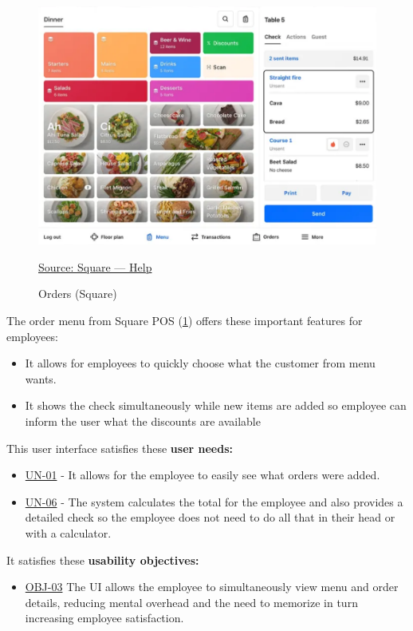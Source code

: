 \documentclass[]{VUMIFTemplateClass}
\begin{document}
\begin{figure}[H]
    \centering
    \includegraphics[width=\textwidth]{images/examples/square_orders.png}
    \caption{Orders (Square)}
    \href{https://squareup.com/help/us/en}{Source: Square — Help}
    \label{fig:square-orders}
\end{figure}

The order menu from Square POS (\ref{fig:square-orders}) offers these important features for employees:

\begin{itemize}
    \item It allows for employees to quickly choose what the customer from menu wants.
    \item It shows the check simultaneously while new items are added so employee can inform the user what the discounts are available
\end{itemize}

This user interface satisfies these \textbf{user needs:}

\begin{itemize}
    \item \hyperref[UN-01]{UN-01} - It allows for the employee to easily see what orders were added.
    \item \hyperref[UN-06]{UN-06} - The system calculates the total for the employee and also provides a detailed check so the employee does not need to do all that in their head or with a calculator.
\end{itemize}

It satisfies these \textbf{usability objectives:}

\begin{itemize}
    \item \hyperref[OBJ-03]{OBJ-03} The UI allows the employee to simultaneously view menu and order details, reducing mental overhead and the need to memorize in turn increasing employee satisfaction.
\end{itemize}
\end{document}
